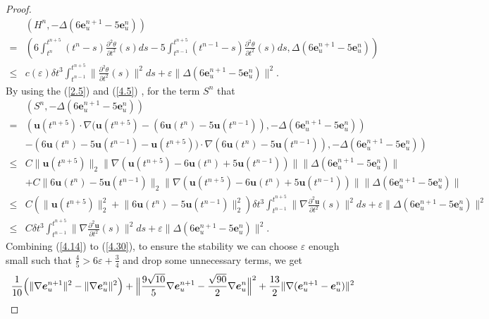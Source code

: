 \documentclass[10pt]{article}
\begin{document}
\begin{proof}
		\begin{align}
			&(H^n,-\Delta(6\bm{e}_u^{n+1}-5\bm{e}_u^n)) \\
			= &(6\int^{t^{n+5}}_{t^{n}}(t^{n}-s)\frac{\partial^2\theta}{\partial t^2}(s)ds-5\int^{t^{n+5}}_{t^{n-1}}(t^{n-1}-s)\frac{\partial^2\theta}{\partial t^2}(s)ds,\Delta(6\bm{e}_u^{n+1}-5\bm{e}_u^n))\nonumber\\
			\leq & c(\varepsilon)\delta t^3\int^{t^{n+5}}_{t^{n-1}}\|\frac{\partial^2\theta}{\partial t^2}(s)\|^2ds+\varepsilon\|\Delta(6\bm{e}_u^{n+1}-5\bm{e}_u^n)\|^2.\nonumber
		\end{align}
		By using the (\ref{2.5}) and (\ref{4.5}) , for the term $S^n$ that
		\begin{align}\label{4.30}
			&(S^n,-\Delta(6\bm{e}_u^{n+1}-5\bm{e}_u^n))\\
			=&({ \bm{u}(t^{n+5})\cdot\nabla(\bm{u}(t^{n+5})-(6\bm{u}(t^{n})-5\bm{u}(t^{n-1}))},-\Delta(6\bm{e}_u^{n+1}-5\bm{e}_u^n))\nonumber\\
			& -({ 6\bm{u}(t^{n})-5\bm{u}(t^{n-1})-\bm{u}(t^{n+5}))\cdot\nabla(6\bm{u}(t^{n})-5\bm{u}(t^{n-1}))},-\Delta(6\bm{e}_u^{n+1}-5\bm{e}_u^n))\nonumber\\
			\leq& C\|\bm{u}(t^{n+5})\|_2{ \|\nabla(\bm{u}(t^{n+5})-6\bm{u}(t^{n})+5\bm{u}(t^{n-1}))\|}\|\Delta(6\bm{e}_u^{n+1}-5\mathbf{e}_u^n)\|\nonumber\\
			& +C{ \|6\bm{u}(t^{n})-5\bm{u}(t^{n-1})\|_2}\|\nabla(\bm{u}(t^{n+5})-6\bm{u}(t^{n})+5\bm{u}(t^{n-1}))\|\|\Delta(6\bm{e}_u^{n+1}-5\bm{e}_u^n)\|\nonumber\\
			\leq& C(\|\bm{u}(t^{n+5})\|^2_2+{ \|6\bm{u}(t^{n})-5\bm{u}(t^{n-1})\|_2^2})\delta t^3\int^{t^{n+5}}_{t^{n-1}}\|\nabla\frac{\partial^2\bm{u}}{\partial t^2}(s)\|^2ds+\varepsilon\|\Delta(6\bm{e}_u^{n+1}-5\bm{e}_u^n)\|^2\nonumber\\
			\leq& C\delta t^3\int^{t^{n+5}}_{t^{n-1}}\|\nabla\frac{\partial^2\bm{u}}{\partial t^2}(s)\|^2ds+\varepsilon\|\Delta(6\bm{e}_u^{n+1}-5\bm{e}_u^n)\|^2.\nonumber
		\end{align}
		Combining (\ref{4.14}) to (\ref{4.30}), to ensure the stability we can choose $\varepsilon$ enough small such that $\frac{4}{5}>6\varepsilon+\frac{3}{4}$ and drop some unnecessary terms, we get
		\begin{align}
			& \frac{1}{10} \Bigl( \|\nabla \boldsymbol{e}_u^{n+1}\|^2 - \|\nabla \boldsymbol{e}_u^n\|^2 \Bigr) 
			+  \Bigl\|\frac{9\sqrt{10}}{5} \nabla \boldsymbol{e}_u^{n+1} - \frac{\sqrt{90}}{2} \nabla \boldsymbol{e}_u^n \Bigr\|^2 
			+ \frac{13}{2} \|\nabla (\boldsymbol{e}_u^{n+1} - \boldsymbol{e}_u^{n})\|^2 \nonumber\\

\end{align}
\end{proof}
\end{document}
